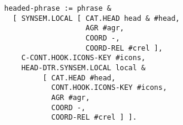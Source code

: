 \documentclass[a4paper]{article}
\begin{document}
{\small\begin{verbatim}
headed-phrase := phrase & 
  [ SYNSEM.LOCAL [ CAT.HEAD head & #head,
                   AGR #agr,
                   COORD -,
                   COORD-REL #crel ],
    C-CONT.HOOK.ICONS-KEY #icons,
    HEAD-DTR.SYNSEM.LOCAL local &
		 [ CAT.HEAD #head,
		   CONT.HOOK.ICONS-KEY #icons,
		   AGR #agr,
		   COORD -,
		   COORD-REL #crel ] ].
\end{verbatim}}
\end{document}

